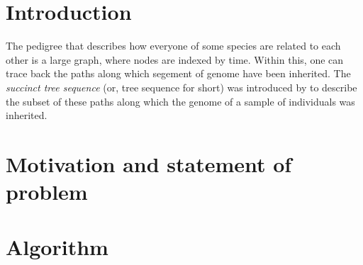\documentclass{article}
\begin{document}
% 

\section{Introduction}


The pedigree that describes how everyone of some species
are related to each other
is a large graph, where nodes are indexed by time.
Within this, one can trace back the paths along which segement of genome
have been inherited.
The \emph{succinct tree sequence} (or, tree sequence for short)
was introduced by \citet{kelleher2016efficient} to describe the subset of these paths
along which the genome of a sample of individuals was inherited.


\section{Motivation and statement of problem}



\section{Algorithm}

\end{document}
